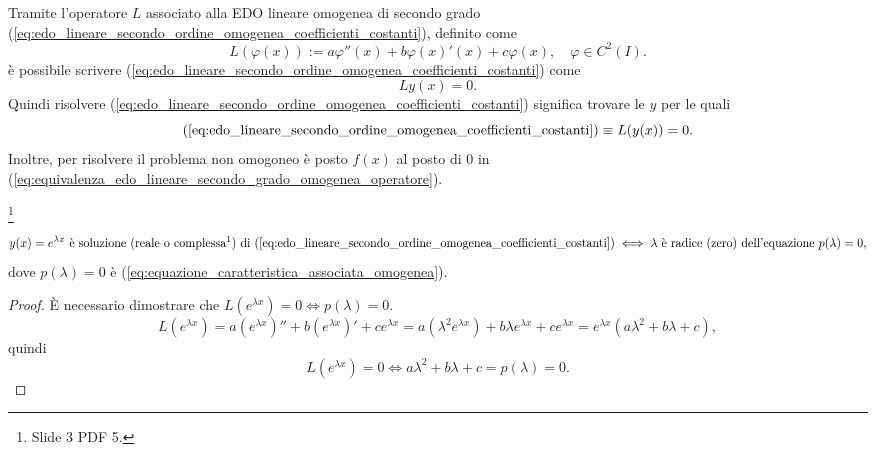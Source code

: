\begin{remark}
	Tramite l'operatore $L$ associato alla EDO lineare omogenea di secondo grado (\ref{eq:edo_lineare_secondo_ordine_omogenea_coefficienti_costanti}), definito come 
	\begin{equation*}
		L(\varphi(x)):=a\varphi''(x) + b\varphi(x)'(x) + c\varphi(x),\quad \varphi\in C^2(I).
	\end{equation*}
	è possibile scrivere (\ref{eq:edo_lineare_secondo_ordine_omogenea_coefficienti_costanti}) come
	\begin{equation*}
		Ly(x)=0.
	\end{equation*}
	Quindi risolvere (\ref{eq:edo_lineare_secondo_ordine_omogenea_coefficienti_costanti}) significa trovare le $y$ per le quali
	\begin{equation}\label{eq:equivalenza_edo_lineare_secondo_grado_omogenea_operatore}
		(\ref{eq:edo_lineare_secondo_ordine_omogenea_coefficienti_costanti})\equiv L(y(x)) = 0.
	\end{equation}
	Inoltre, per risolvere il problema non omogoneo è posto $f(x)$ al posto di 0 in (\ref{eq:equivalenza_edo_lineare_secondo_grado_omogenea_operatore}).
\end{remark}

\begin{proposition}\footnote{Slide 3 PDF 5.}\label{prop:e^lambdax_soluzione_omogenea_secondo_grado_lineare}
	\begin{equation*}
		y(x)=e^{\lambda x}\text{ è soluzione (reale o complessa\footnotemark) di (\ref{eq:edo_lineare_secondo_ordine_omogenea_coefficienti_costanti})} \iff \lambda \text{ è radice (zero) dell'equazione } p(\lambda)=0,
	\end{equation*}
	dove $p(\lambda)=0$ è (\ref{eq:equazione_caratteristica_associata_omogenea}).
\end{proposition}
\begin{proof}
	È necessario dimostrare che $L(e^{\lambda x})=0\iff p(\lambda)=0$.
	\begin{equation*}
		L(e^{\lambda x}) = a(e^{\lambda x})''+ b(e^{\lambda x})'+ c e^{\lambda x} = a(\lambda^2 e^{\lambda x}) + b\lambda e^{\lambda x} + c e^{\lambda x} = e^{\lambda x} (a\lambda ^2 + b\lambda + c),
	\end{equation*}
	quindi
	\begin{equation*}
		L(e^{\lambda x}) = 0 \iff a\lambda^2 + b\lambda + c=p(\lambda) = 0.
	\end{equation*}
\end{proof}

